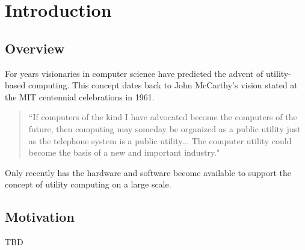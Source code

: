 
\chapter{Introduction}
\label{chap:intro}

\section{Overview}
\label{sec:overview}

For years visionaries in computer science have predicted the advent of utility-based computing.  This concept dates back to John McCarthy's vision stated at the MIT centennial celebrations in 1961. 

\begin{quote}
``If computers of the kind I have advocated become the computers of the future, then computing may someday be organized as a public utility just as the telephone system is a public utility... The computer utility could become the basis of a new and important industry."
\end{quote}

 Only recently has the hardware and software become available to support the concept of utility computing on a large scale. 


\section{Motivation}
\label{sec:motive}

TBD


